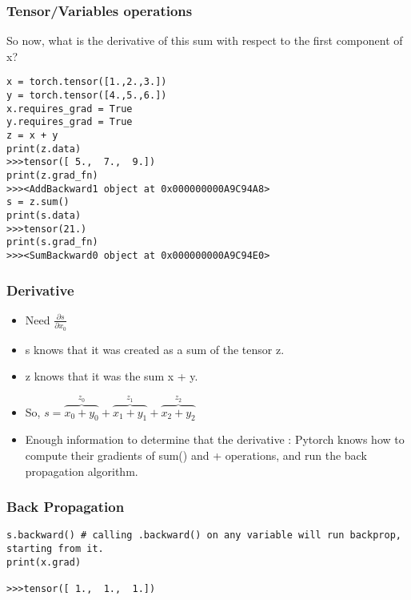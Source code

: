  
  
\begin{frame}[fragile]
\frametitle{Tensor/Variables operations}

So now, what is the derivative of this sum with respect to the first component of x? 


 \begin{lstlisting}
x = torch.tensor([1.,2.,3.])
y = torch.tensor([4.,5.,6.])
x.requires_grad = True
y.requires_grad = True
z = x + y
print(z.data)
>>>tensor([ 5.,  7.,  9.])
print(z.grad_fn)
>>><AddBackward1 object at 0x000000000A9C94A8>
s = z.sum()
print(s.data)
>>>tensor(21.)
print(s.grad_fn)
>>><SumBackward0 object at 0x000000000A9C94E0>
\end{lstlisting}
\end{frame} 
 
\begin{frame}[fragile]
\frametitle{Derivative}
\begin{itemize}
\item Need $\frac{\partial s}{\partial x_0}$
\item s knows that it was created as a sum of the tensor z. 
\item z knows that it was the sum x + y. 
\item So, $s = \overbrace{x_0 + y_0}^\text{$z_0$} + \overbrace{x_1 + y_1}^\text{$z_1$} + \overbrace{x_2 + y_2}^\text{$z_2$}$
\item Enough information to determine that the derivative : Pytorch knows how to compute their gradients of sum() and + operations, and run the back propagation algorithm. 
\end{itemize}


\end{frame} 
 
\begin{frame}[fragile]
\frametitle{Back Propagation}

\begin{lstlisting}
s.backward() # calling .backward() on any variable will run backprop, starting from it.
print(x.grad)

>>>tensor([ 1.,  1.,  1.])
\end{lstlisting}

\end{frame} 
 
